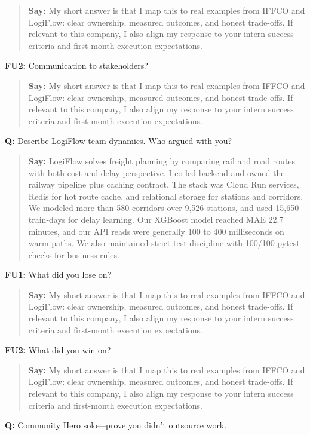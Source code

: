 \documentclass[9pt,a4paper]{article}
\begin{document}
\begin{quote}\small\textbf{Say:} My short answer is that I map this to real examples from IFFCO and LogiFlow: clear ownership, measured outcomes, and honest trade-offs. If relevant to this company, I also align my response to your intern success criteria and first-month execution expectations.\end{quote}
\vspace{2mm}
\textbf{FU2:} Communication to stakeholders?

\begin{quote}\small\textbf{Say:} My short answer is that I map this to real examples from IFFCO and LogiFlow: clear ownership, measured outcomes, and honest trade-offs. If relevant to this company, I also align my response to your intern success criteria and first-month execution expectations.\end{quote}
\vspace{2mm}
\textbf{Q:} Describe LogiFlow team dynamics. Who argued with you?

\begin{quote}\small\textbf{Say:} LogiFlow solves freight planning by comparing rail and road routes with both cost and delay perspective. I co-led backend and owned the railway pipeline plus caching contract. The stack was Cloud Run services, Redis for hot route cache, and relational storage for stations and corridors. We modeled more than 580 corridors over 9,526 stations, and used 15,650 train-days for delay learning. Our XGBoost model reached MAE 22.7 minutes, and our API reads were generally 100 to 400 milliseconds on warm paths. We also maintained strict test discipline with 100/100 pytest checks for business rules.\end{quote}
\vspace{2mm}
\textbf{FU1:} What did you lose on?

\begin{quote}\small\textbf{Say:} My short answer is that I map this to real examples from IFFCO and LogiFlow: clear ownership, measured outcomes, and honest trade-offs. If relevant to this company, I also align my response to your intern success criteria and first-month execution expectations.\end{quote}
\vspace{2mm}
\textbf{FU2:} What did you win on?

\begin{quote}\small\textbf{Say:} My short answer is that I map this to real examples from IFFCO and LogiFlow: clear ownership, measured outcomes, and honest trade-offs. If relevant to this company, I also align my response to your intern success criteria and first-month execution expectations.\end{quote}
\vspace{2mm}
\textbf{Q:} Community Hero solo---prove you didn't outsource work.
\end{document}

